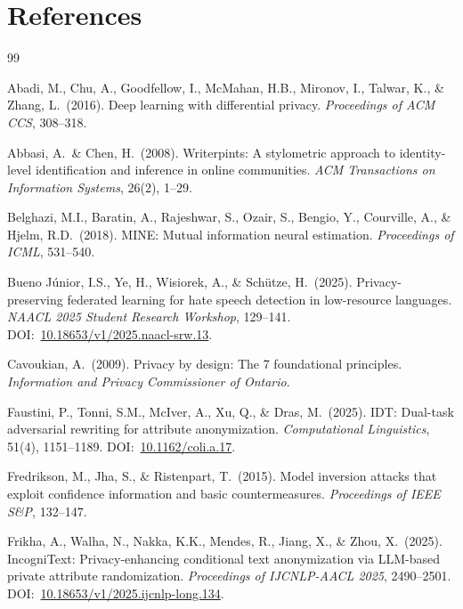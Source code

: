 \documentclass{article}
\begin{document}
\section*{References}
{\small
\begin{thebibliography}{99}

  Abadi, M., Chu, A., Goodfellow, I., McMahan, H.B., Mironov, I., Talwar, K.,
  \& Zhang, L.\ (2016).
  Deep learning with differential privacy.
  {\it Proceedings of ACM CCS}, 308--318.

  Abbasi, A.\ \& Chen, H.\ (2008).
  Writerpints: A stylometric approach to identity-level identification and
  inference in online communities.
  {\it ACM Transactions on Information Systems}, 26(2), 1--29.

  Belghazi, M.I., Baratin, A., Rajeshwar, S., Ozair, S., Bengio, Y.,
  Courville, A., \& Hjelm, R.D.\ (2018).
  MINE: Mutual information neural estimation.
  {\it Proceedings of ICML}, 531--540.

  Bueno J\'unior, I.S., Ye, H., Wisiorek, A., \& Sch\"utze, H.\ (2025).
  Privacy-preserving federated learning for hate speech detection in
  low-resource languages.
  {\it NAACL 2025 Student Research Workshop}, 129--141.
  DOI:~\href{https://doi.org/10.18653/v1/2025.naacl-srw.13}{10.18653/v1/2025.naacl-srw.13}.

  Cavoukian, A.\ (2009).
  Privacy by design: The 7 foundational principles.
  {\it Information and Privacy Commissioner of Ontario}.

  Faustini, P., Tonni, S.M., McIver, A., Xu, Q., \& Dras, M.\ (2025).
  IDT: Dual-task adversarial rewriting for attribute anonymization.
  {\it Computational Linguistics}, 51(4), 1151--1189.
  DOI:~\href{https://doi.org/10.1162/coli.a.17}{10.1162/coli.a.17}.

  Fredrikson, M., Jha, S., \& Ristenpart, T.\ (2015).
  Model inversion attacks that exploit confidence information and basic
  countermeasures.
  {\it Proceedings of IEEE S\&P}, 132--147.

  Frikha, A., Walha, N., Nakka, K.K., Mendes, R., Jiang, X., \& Zhou, X.\ (2025).
  IncogniText: Privacy-enhancing conditional text anonymization via LLM-based
  private attribute randomization.
  {\it Proceedings of IJCNLP-AACL 2025}, 2490--2501.
  DOI:~\href{https://doi.org/10.18653/v1/2025.ijcnlp-long.134}{10.18653/v1/2025.ijcnlp-long.134}.


\end{thebibliography}}
\end{document}

